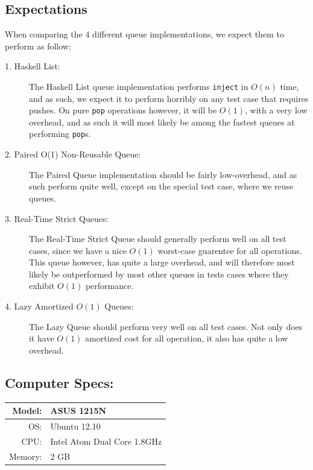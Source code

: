 \subsection{Expectations}
When comparing the 4 different queue implementations, we expect them to perform as follow:
\begin{description}

\item[1. Haskell List:]
The Haskell List queue implementation performs \texttt{inject} in $O(n)$ time, and as such, we expect it to perform horribly on any test case that requires pushes.
On pure \texttt{pop} operations however, it will be $O(1)$, with a very low overhead, and as such it will most likely be among the fastest queues at performing \texttt{pop}s.
\item[2. Paired O(1) Non-Reusable Queue:]
The Paired Queue implementation should be fairly low-overhead, and as such perform quite well, except on the special test case, where we reuse queues.
\item[3. Real-Time Strict Queues:] 
The Real-Time Strict Queue should generally perform well on all test cases, since we have a nice $O(1)$ worst-case guarentee for all operations. This queue however, has quite a large overhead, and will therefore most likely be outperformed by most other queues in tests cases where they exhibit $O(1)$ performance. 
\item[4. Lazy Amortized $O(1)$ Queues:]
The Lazy Queue should perform very well on all test cases. Not only does it have $O(1)$ amortized cost for all operation, it also has quite a low overhead. 

\end{description}

\subsection{Computer Specs:}
\begin{tabular}{| r  l |} \hline
Model: &  ASUS 1215N \\ \hline
OS: & Ubuntu 12.10 \\ \hline
CPU: & Intel Atom Dual Core 1.8GHz\\ \hline
Memory: & 2 GB\\ \hline
\end{tabular}

